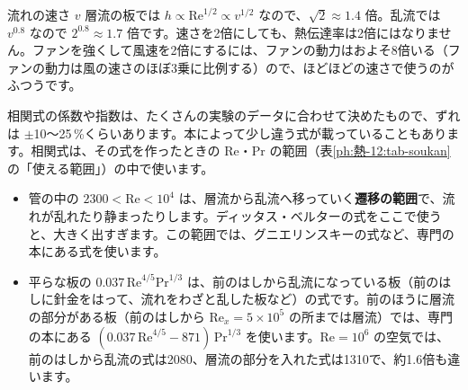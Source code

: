 \begin{phbaisuru}{流れの速さ $v$}
層流の板では $h\propto\mathrm{Re}^{1/2}\propto v^{1/2}$ なので、$\sqrt2\approx1.4$ 倍。乱流では $v^{0.8}$ なので $2^{0.8}\approx1.7$ 倍です。速さを2倍にしても、熱伝達率は2倍にはなりません。ファンを強くして風速を2倍にするには、ファンの動力はおよそ8倍いる（ファンの動力は風の速さのほぼ3乗に比例する）ので、ほどほどの速さで使うのがふつうです。
\par\smallskip\noindent{}
\end{phbaisuru}

\begin{seikaku}
相関式の係数や指数は、たくさんの実験のデータに合わせて決めたもので、ずれは $\pm$10〜25\,\%くらいあります。本によって少し違う式が載っていることもあります。相関式は、その式を作ったときの Re・Pr の範囲（表\ref{ph:熱-12:tab-soukan}の「使える範囲」）の中で使います。
\begin{itemize}[leftmargin=1.2\zw, itemsep=1pt, topsep=2pt, label={・}]
\item 管の中の $2300<\mathrm{Re}<10^4$ は、層流から乱流へ移っていく\textbf{遷移の範囲}で、流れが乱れたり静まったりします。ディッタス・ベルターの式をここで使うと、大きく出すぎます。この範囲では、グニエリンスキーの式など、専門の本にある式を使います。
\item 平らな板の $0.037\,\mathrm{Re}^{4/5}\mathrm{Pr}^{1/3}$ は、前のはしから乱流になっている板（前のはしに針金をはって、流れをわざと乱した板など）の式です。前のほうに層流の部分がある板（前のはしから $\mathrm{Re}_x=5\times10^5$ の所までは層流）では、専門の本にある $(0.037\,\mathrm{Re}^{4/5}-871)\,\mathrm{Pr}^{1/3}$ を使います。$\mathrm{Re}=10^6$ の空気では、前のはしから乱流の式は2080、層流の部分を入れた式は1310で、約1.6倍も違います。
\end{itemize}
\end{seikaku}

